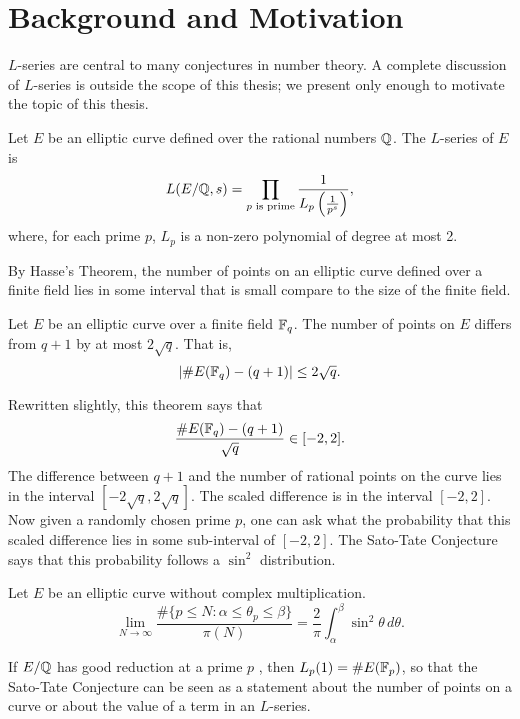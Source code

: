 

\section{Background and Motivation}

$L$-series are central to many conjectures in number theory.
A complete discussion of $L$-series is outside the scope of this thesis;
we present only enough to motivate the topic of this thesis.

Let $E$ be an elliptic curve defined over the rational numbers $\mathbb{Q}$.
The $L$-series of $E$ is
\[ L(E/\mathbb{Q}, s)  = \prod_{p \text{ is prime}} \frac 1 {L_p \left( \frac 1 {p^s} \right)},\]
where, for each prime $p$, $L_p$ is a non-zero polynomial of degree at most 2.

By Hasse's Theorem, the number of points on an elliptic curve defined over a finite field
lies in some interval that is small compare to the size of the finite field.
\begin{theorem}[Hasse]
  Let $E$ be an elliptic curve over a finite field $\mathbb{F}_q$.
  The number of points on $E$ differs from $q + 1$ by at most $2 \sqrt q$.
  That is,
  \[ | \#E(\mathbb{F}_q) - (q + 1) | \leq 2 \sqrt q. \]
\end{theorem}

Rewritten slightly, this theorem says that
  \[ \frac {\#E(\mathbb{F}_q) - (q + 1)} {\sqrt q} \in [-2, 2]. \]
The difference between $q + 1$ and the number of rational points on the curve
lies in the interval $[-2 \sqrt q, 2 \sqrt q]$.
The scaled difference is in the interval $[-2, 2]$.
Now given a randomly chosen prime $p$,
one can ask what the probability that this scaled difference lies in some sub-interval of $[-2, 2]$.
The Sato-Tate Conjecture says that this probability follows a $\sin^2$ distribution.
\begin{conjecture}
  Let $E$ be an elliptic curve without complex multiplication.
  \[ \lim_{N \to \infty}
    \frac {\#\{ p \leq N : \alpha \leq \theta_p \leq \beta \}} {\pi(N)} =
    \frac 2 \pi \int_{\alpha}^{\beta} \sin^2 \theta\,d\theta. \]
\end{conjecture}

If $E/\mathbb{Q}$ has good reduction at a prime $p$
,
then $L_p(1) = \#E(\mathbb{F}_p)$,
so that the Sato-Tate Conjecture can be seen as a statement about the number of points on a curve
or about the value of a term in an $L$-series.

